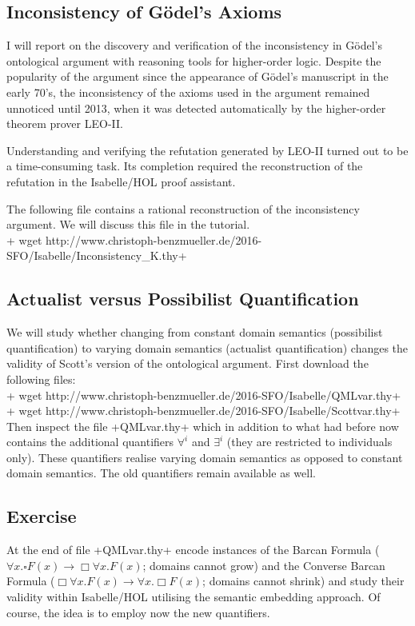 \documentclass{article}
\begin{document}
\subsection{Inconsistency of G\"odel's Axioms}
I will report on the discovery and verification of the inconsistency
in G\"odel’s ontological argument with reasoning tools for higher-order
logic. Despite the popularity of the argument since the appearance of
G\"odel’s manuscript in the early 70's, the inconsistency of the axioms
used in the argument remained unnoticed until 2013, when it was
detected automatically by the higher-order theorem prover LEO-II.

Understanding and verifying the refutation generated by LEO-II turned
out to be a time-consuming task. Its completion required the
reconstruction of the refutation in the Isabelle/HOL proof assistant.

The following file contains a rational reconstruction of the
inconsistency argument. We will discuss this file in the tutorial. \\[1em]
+ wget http://www.christoph-benzmueller.de/2016-SFO/Isabelle/Inconsistency_K.thy+\\


\subsection{Actualist versus Possibilist Quantification}
We will study whether changing from constant domain semantics
(possibilist quantification) to
varying domain semantics (actualist quantification) changes the validity of Scott's version of the
ontological argument. First download the following files: \\[1em]
+ wget http://www.christoph-benzmueller.de/2016-SFO/Isabelle/QMLvar.thy+\\
+ wget http://www.christoph-benzmueller.de/2016-SFO/Isabelle/Scottvar.thy+\\

Then inspect the file +QMLvar.thy+ which in addition to what had
before now contains the additional quantifiers $\boldsymbol{\forall}^i$ and
$\boldsymbol{\exists}^i$ (they are restricted to individuals
only). These quantifiers 
realise varying domain semantics as opposed to constant domain
semantics. The old quantifiers remain available as well.

\subsection{Exercise}
At the end of file +QMLvar.thy+ encode instances of the Barcan Formula ($\forall x. \square F(x)
\longrightarrow \Box \forall x. F(x)$; domains cannot grow) and the Converse Barcan
Formula ($\Box \forall x. F(x) \longrightarrow \forall x. \Box F(x)$; domains cannot shrink)
and study their validity within Isabelle/HOL utilising the semantic
embedding approach. Of course, the idea is to employ now the new quantifiers.
\end{document}
